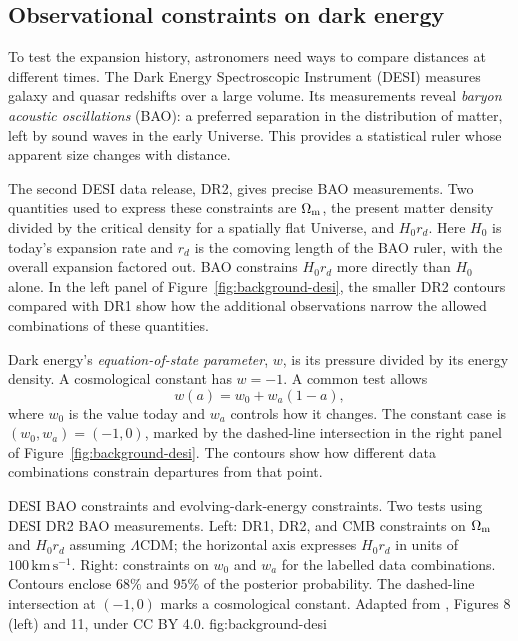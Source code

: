 \subsection{Observational constraints on dark energy}
\label{sec:dark-energy-background}

To test the expansion history, astronomers need ways to compare distances
at different times. The Dark Energy Spectroscopic Instrument (DESI)
\citep{2025PhRvD.112h3515A} measures galaxy and quasar redshifts over a large
volume. Its measurements reveal \emph{baryon acoustic oscillations} (BAO): a
preferred separation in the distribution of matter, left by sound waves in
the early Universe. This provides a statistical ruler whose apparent size
changes with distance.

The second DESI data release, DR2, gives precise BAO measurements.
Two quantities used to express these constraints are $\Omega_{\rm m}$,
the present matter density divided by the critical density for a spatially
flat Universe, and $H_0r_d$. Here $H_0$ is today's expansion rate and $r_d$
is the comoving length of the BAO ruler, with the overall expansion factored
out. BAO constrains $H_0r_d$ more directly than $H_0$ alone.
In the left panel of Figure~\ref{fig:background-desi}, the smaller DR2
contours compared with DR1 show how the additional observations narrow the
allowed combinations of these quantities.

Dark energy's \emph{equation-of-state parameter}, $w$, is its pressure
divided by its energy density. A cosmological constant has $w=-1$. A common
test allows
\begin{equation}
  w(a)=w_0+w_a(1-a),
  \label{eq:dark-energy-evolution}
\end{equation}
where $w_0$ is the value today and $w_a$ controls how it changes. The constant
case is $(w_0,w_a)=(-1,0)$, marked by the dashed-line intersection in the
right panel of Figure~\ref{fig:background-desi}. The contours show how
different data combinations constrain departures from that point.

  {DESI BAO constraints and evolving-dark-energy constraints.}
  {Two tests using DESI DR2 BAO measurements. Left: DR1, DR2, and CMB
   constraints on $\Omega_{\rm m}$ and $H_0r_d$ assuming $\Lambda$CDM;
   the horizontal axis expresses $H_0r_d$ in units of
   $100\,\mathrm{km\,s^{-1}}$. Right: constraints on $w_0$ and $w_a$
   for the labelled data combinations. Contours enclose $68\%$ and $95\%$
   of the posterior probability. The dashed-line intersection at $(-1,0)$
   marks a cosmological constant. Adapted from
   \citet{2025PhRvD.112h3515A}, Figures 8 (left) and 11, under CC BY 4.0.}
  {fig:background-desi}

